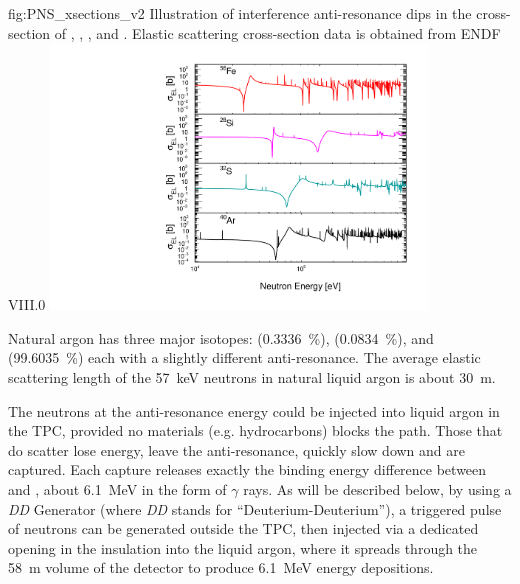 \begin{dunefigure}{fig:PNS_xsections_v2}
{Illustration of interference anti-resonance dips in the cross-section of , , , and . Elastic scattering cross-section data is obtained from ENDF VIII.0}
\includegraphics[width=10cm]{graphics/PNS_xsection.pdf}
\end{dunefigure}

Natural argon has three major isotopes:  (\SI{0.3336}{\%}),  (\SI{0.0834}{\%}), and  (\SI{99.6035}{\%}) each with a slightly different anti-resonance. The average elastic scattering length of the \SI{57}{\keV} neutrons in natural liquid argon is about \SI{30}{\m}.

The neutrons at the anti-resonance energy could be injected into liquid argon in the TPC, provided no materials (e.g. hydrocarbons) blocks the path. Those that do scatter lose energy, leave the anti-resonance, quickly slow down and are captured. Each capture releases exactly the binding energy difference between  and , about \SI{6.1}{\MeV} in the form of $\gamma$ rays.  As will be described below, by using a {\it DD} Generator (where {\it DD} stands for ``Deuterium-Deuterium''), a triggered pulse of neutrons can be generated outside the TPC, then injected via a dedicated opening in the insulation into the liquid argon, where it spreads through the \SI{58}{\m} volume of the detector to produce \SI{6.1}{\MeV} energy depositions.

